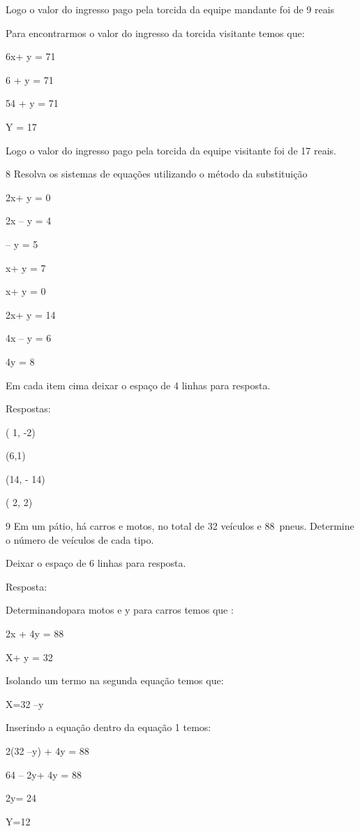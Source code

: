 Logo o valor do ingresso pago pela torcida da equipe mandante foi de 9
reais

Para encontrarmos o valor do ingresso da torcida visitante temos que:

6x+ y = 71

6 + y = 71

54 + y = 71

Y = 17

Logo o valor do ingresso pago pela torcida da equipe visitante foi de 17
reais.

\num{8} Resolva os sistemas de equações utilizando o método da substituição

\item 2x+ y = 0

2x -- y = 4

\item\times -- y = 5

x+ y = 7

\item x+ y = 0

2x+ y = 14

\item 4x -- y = 6

4y = 8

Em cada item cima deixar o espaço de 4 linhas para resposta.

Respostas:

\item ( 1, -2)
\item (6,1)
\item (14, - 14)
\item ( 2, 2)

\num{9} Em um pátio, há carros e motos, no total de 32 veículos e 88~pneus.
Determine o número de veículos de cada tipo.

Deixar o espaço de 6 linhas para resposta.

Resposta:

Determinando\times para motos e y para carros temos que :

2x + 4y = 88

X+ y = 32

Isolando um termo na segunda equação temos que:

X=32 --y

Inserindo a equação dentro da equação 1 temos:

2(32 --y) + 4y = 88

64 -- 2y+ 4y = 88

2y= 24

Y=12

